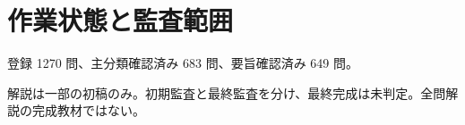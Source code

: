 \chapter{作業状態と監査範囲}
登録 1270 問、主分類確認済み 683 問、要旨確認済み 649 問。
\par 解説は一部の初稿のみ。初期監査と最終監査を分け、最終完成は未判定。全問解説の完成教材ではない。
